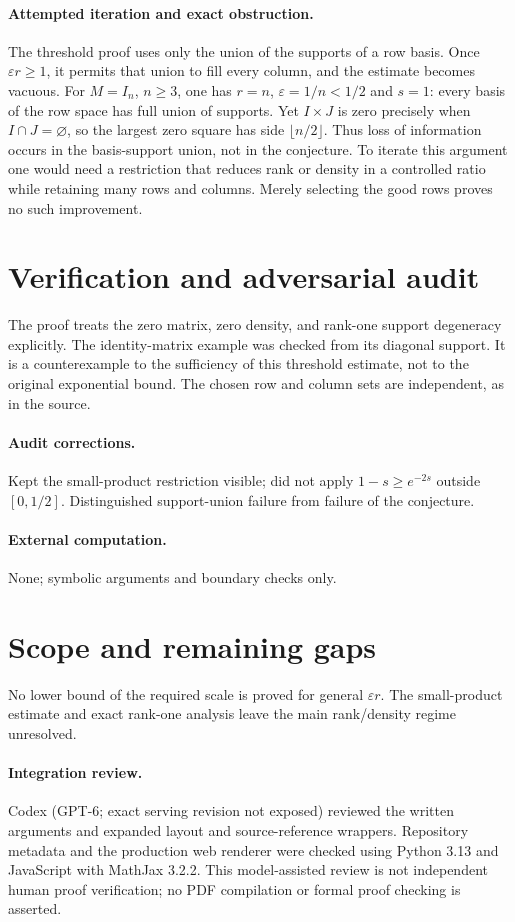 \documentclass[11pt]{article}
\begin{document}
\paragraph{Attempted iteration and exact obstruction.}
The threshold proof uses only the union of the supports of a row basis. Once $\varepsilon r\geq1$, it permits that union to fill every column, and the estimate becomes vacuous. For $M=I_n$, $n\geq3$, one has $r=n$, $\varepsilon=1/n<1/2$ and $s=1$: every basis of the row space has full union of supports. Yet $I\times J$ is zero precisely when $I\cap J=\varnothing$, so the largest zero square has side $\lfloor n/2\rfloor$. Thus loss of information occurs in the basis-support union, not in the conjecture. To iterate this argument one would need a restriction that reduces rank or density in a controlled ratio while retaining many rows and columns. Merely selecting the good rows proves no such improvement.
\section{Verification and adversarial audit}
The proof treats the zero matrix, zero density, and rank-one support degeneracy explicitly. The identity-matrix example was checked from its diagonal support. It is a counterexample to the sufficiency of this threshold estimate, not to the original exponential bound. The chosen row and column sets are independent, as in the source.
\paragraph{Audit corrections.} Kept the small-product restriction visible; did not apply $1-s\geq e^{-2s}$ outside $[0,1/2]$. Distinguished support-union failure from failure of the conjecture.
\paragraph{External computation.} None; symbolic arguments and boundary checks only.
\section{Scope and remaining gaps}
No lower bound of the required scale is proved for general $\varepsilon r$. The small-product estimate and exact rank-one analysis leave the main rank/density regime unresolved.
\paragraph{Integration review.} Codex (GPT-6; exact serving revision not exposed) reviewed the written arguments and expanded layout and source-reference wrappers. Repository metadata and the production web renderer were checked using Python 3.13 and JavaScript with MathJax 3.2.2. This model-assisted review is not independent human proof verification; no PDF compilation or formal proof checking is asserted.
\end{document}
